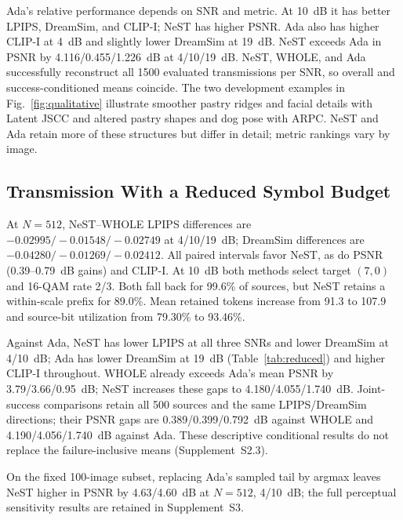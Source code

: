 Ada's relative performance depends on SNR and metric. At 10~dB it has better LPIPS, DreamSim, and CLIP-I; NeST has higher PSNR. Ada also has higher CLIP-I at 4~dB and slightly lower DreamSim at 19~dB. NeST exceeds Ada in PSNR by 4.116/0.455/1.226~dB at 4/10/19~dB. NeST, WHOLE, and Ada successfully reconstruct all 1500 evaluated transmissions per SNR, so overall and success-conditioned means coincide. The two development examples in Fig.~\ref{fig:qualitative} illustrate smoother pastry ridges and facial details with Latent JSCC and altered pastry shapes and dog pose with ARPC. NeST and Ada retain more of these structures but differ in detail; metric rankings vary by image.

\subsection{Transmission With a Reduced Symbol Budget}

At $N=512$, NeST--WHOLE LPIPS differences are $-0.02995/-0.01548/-0.02749$ at 4/10/19~dB; DreamSim differences are $-0.04280/-0.01269/-0.02412$. All paired intervals favor NeST, as do PSNR (0.39--0.79~dB gains) and CLIP-I. At 10~dB both methods select target $(7,0)$ and 16-QAM rate 2/3. Both fall back for 99.6\% of sources, but NeST retains a within-scale prefix for 89.0\%. Mean retained tokens increase from 91.3 to 107.9 and source-bit utilization from 79.30\% to 93.46\%.

Against Ada, NeST has lower LPIPS at all three SNRs and lower DreamSim at 4/10~dB; Ada has lower DreamSim at 19~dB (Table~\ref{tab:reduced}) and higher CLIP-I throughout. WHOLE already exceeds Ada's mean PSNR by 3.79/3.66/0.95~dB; NeST increases these gaps to 4.180/4.055/1.740~dB. Joint-success comparisons retain all 500 sources and the same LPIPS/DreamSim directions; their PSNR gaps are 0.389/0.399/0.792~dB against WHOLE and 4.190/4.056/1.740~dB against Ada. These descriptive conditional results do not replace the failure-inclusive means (Supplement~S2.3).

On the fixed 100-image subset, replacing Ada's sampled tail by argmax leaves NeST higher in PSNR by 4.63/4.60~dB at $N=512$, 4/10~dB; the full perceptual sensitivity results are retained in Supplement~S3.